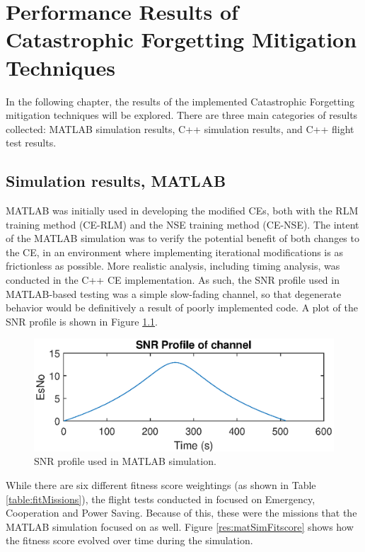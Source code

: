 \chapter{Performance Results of Catastrophic Forgetting Mitigation Techniques}\label{ch:results}

\par In the following chapter, the results of the implemented Catastrophic Forgetting mitigation techniques will be explored. There are three main categories of results collected: MATLAB simulation results, C++ simulation results, and C++ flight test results. %
\section{Simulation results, MATLAB}
\par MATLAB was initially used in developing the modified CEs, both with the RLM training method (CE-RLM) and the NSE training method (CE-NSE). The intent of the MATLAB simulation was to verify the potential benefit of both changes to the CE, in an environment where implementing iterational modifications is as frictionless as possible. More realistic analysis, including timing analysis, was conducted in the C++ CE implementation. As such, the SNR profile used in MATLAB-based testing was a simple slow-fading channel, so that degenerate behavior would be definitively a result of poorly implemented code. A plot of the SNR profile is shown in Figure \ref{fig:matlabSNRProf}. 
\begin{figure}[ht]
\centering
\includegraphics[scale=1]{figures/matlab_sim_results/snrPRofile_matlabsim.eps}
\caption{SNR profile used in MATLAB simulation.}
\label{fig:matlabSNRProf}
\end{figure}
\par While there are six different fitness score weightings (as shown in Table \ref{table:fitMissions}), the flight tests conducted in \cite{tim_implementation_paper} focused on Emergency, Cooperation and Power Saving. Because of this, these were the missions that the MATLAB simulation focused on as well. Figure \ref{res:matSimFitscore} shows how the fitness score evolved over time during the simulation.

